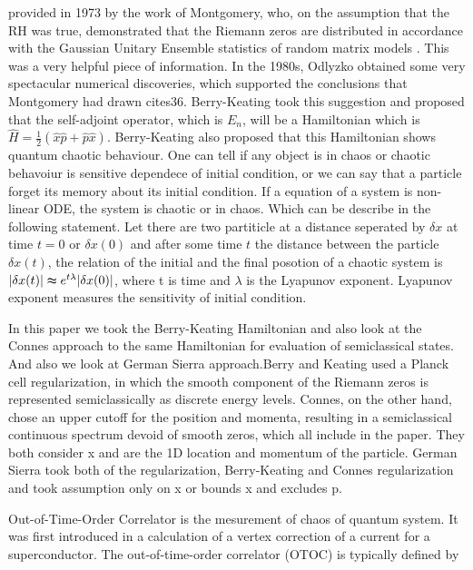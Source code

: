 \documentclass[12pt]{report}
\newcommand*{\1}{\hspace{1pt}}
\begin{document}
    provided in 1973 by the work of Montgomery, who, on the assumption that the RH was true, demonstrated that the Riemann zeros are distributed in accordance with 
    the Gaussian Unitary Ensemble statistics of random matrix models \cite{s35}. This was a very helpful piece of information. In the 1980s, Odlyzko obtained some very
    spectacular numerical discoveries, which supported the conclusions that Montgomery had drawn cite{s36}.  Berry-Keating took this suggestion 
    and proposed that the self-adjoint operator, which 
    is $E_{n}$, will be a Hamiltonian which is $\hat{H} = \frac{1}{2}(\hat{x}\hat{p} + \hat{p}\hat{x})$. Berry-Keating also proposed that this Hamiltonian shows quantum chaotic behaviour.
    One can tell if any object is in chaos or chaotic behavoiur is sensitive dependece of initial condition, or we can say that a particle forget its memory about its initial condition.
    If a equation of a system is non-linear ODE, the system is chaotic or in chaos. Which can be describe in the following statement. Let there are two partiticle at a distance 
    seperated by $\delta x$ at time $t=0$ or  $\delta x(0)$ and after some time $t$ the distance between the particle $\delta x(t)$, the relation of the initial and the final posotion 
    of a chaotic system is $|\delta x(t)| \thickapprox e^{t\lambda} |\delta x(0)|$, where t is time and $\lambda$ is the Lyapunov exponent. Lyapunov exponent measures the sensitivity of initial 
    condition.

    In this paper we took the Berry-Keating Hamiltonian and also look at the Connes approach to the same Hamiltonian for evaluation of semiclassical states.\cite{s1,s15,s3}
    And also we look at German Sierra approach.\cite{s13}Berry and Keating used a Planck cell regularization, in which the smooth component 
    of the Riemann zeros is represented semiclassically as discrete energy levels. Connes, on the other hand, chose an upper 
    cutoff for the position and momenta, resulting in a semiclassical continuous spectrum devoid of smooth zeros, which all include in the paper.
    They both consider x and are the 1D location and momentum of the particle. German Sierra took both of the regularization, Berry-Keating and Connes regularization 
    and took assumption only on x or bounds x and excludes p.

    Out-of-Time-Order Correlator is the mesurement of chaos  of quantum system. It was first introduced in a calculation of a vertex correction of a current for a 
    superconductor\cite{s12}.
    The out-of-time-order correlator (OTOC) is typically defined by \cite{s11}
\end{document}
